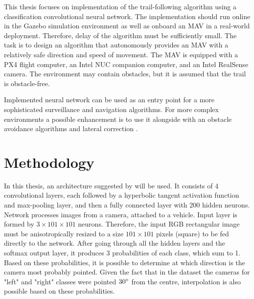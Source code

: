 This thesis focuses on implementation of the trail-following algorithm using a classification convolutional neural network. The implementation should run online in the Gazebo simulation environment as well as onboard an \acs{MAV} in a real-world deployment. Therefore, delay of the algorithm must be sufficiently small. The task is to design an algorithm that autonomously provides an \acs{MAV} with a relatively safe direction and speed of movement. The \acs{MAV} is equipped with a PX4 flight computer, an Intel NUC companion computer, and an Intel RealSense camera. The environment may contain obstacles, but it is assumed that the trail is obstacle-free. 

Implemented neural network can be used as an entry point for a more sophisticated surveillance and navigation algorithms. For more complex environments a possible enhancement is to use it alongside with an obstacle avoidance algorithms and lateral correction \cite{back2020autonomous, maciel2018extending, smolyanskiy2017toward}.















\chapter{Methodology}

In this thesis, an architecture suggested by \citeauthor{giusti2016machine} \cite{giusti2016machine} will be used. It consists of 4 convolutional layers, each followed by a hyperbolic tangent activation function and max-pooling layer, and then a fully connected layer with 200 hidden neurons. Network processes images from a camera, attached to a vehicle. Input layer is formed by $3\times 101\times101$ neurons. Therefore, the input \acs{RGB} rectangular image must be anisotropically resized to a size $101\times101$ pixels (square) to be fed directly to the network. After going through all the hidden layers and the softmax output layer, it produces 3 probabilities of each class, which sum to 1. Based on these probabilities, it is possible to determine at which direction is the camera most probably pointed. Given the fact that in the dataset the cameras for "left" and "right" classes were pointed $30 \degree$ from the centre, interpolation is also possible based on these probabilities.  


